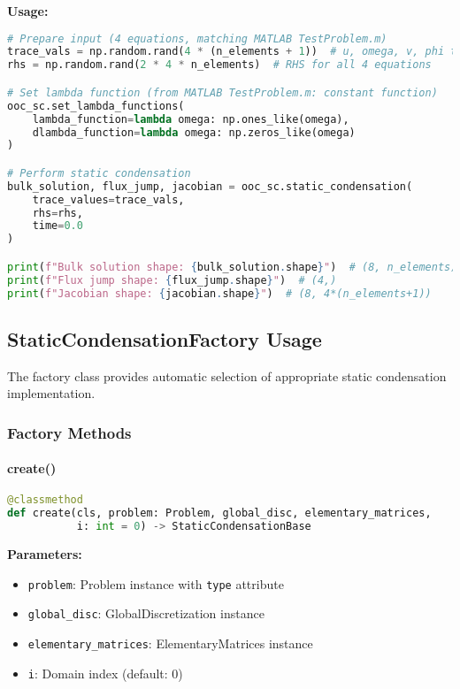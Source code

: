 \textbf{Usage:}
\begin{lstlisting}[language=Python, caption=OrganOnChip Static Condensation Usage]
# Prepare input (4 equations, matching MATLAB TestProblem.m)
trace_vals = np.random.rand(4 * (n_elements + 1))  # u, omega, v, phi traces
rhs = np.random.rand(2 * 4 * n_elements)  # RHS for all 4 equations

# Set lambda function (from MATLAB TestProblem.m: constant function)
ooc_sc.set_lambda_functions(
    lambda_function=lambda omega: np.ones_like(omega),
    dlambda_function=lambda omega: np.zeros_like(omega)
)

# Perform static condensation
bulk_solution, flux_jump, jacobian = ooc_sc.static_condensation(
    trace_values=trace_vals,
    rhs=rhs,
    time=0.0
)

print(f"Bulk solution shape: {bulk_solution.shape}")  # (8, n_elements)
print(f"Flux jump shape: {flux_jump.shape}")  # (4,) 
print(f"Jacobian shape: {jacobian.shape}")  # (8, 4*(n_elements+1))
\end{lstlisting}


\subsection{StaticCondensationFactory Usage}
\label{subsec:factory_usage}

The factory class provides automatic selection of appropriate static condensation implementation.

\subsubsection{Factory Methods}

\paragraph{create()}\leavevmode
\begin{lstlisting}[language=Python, caption=Factory Create Method]
@classmethod
def create(cls, problem: Problem, global_disc, elementary_matrices,
           i: int = 0) -> StaticCondensationBase
\end{lstlisting}

\textbf{Parameters:}
\begin{itemize}
    \item \texttt{problem}: Problem instance with \texttt{type} attribute
    \item \texttt{global\_disc}: GlobalDiscretization instance
    \item \texttt{elementary\_matrices}: ElementaryMatrices instance
    \item \texttt{i}: Domain index (default: 0)
\end{itemize}

